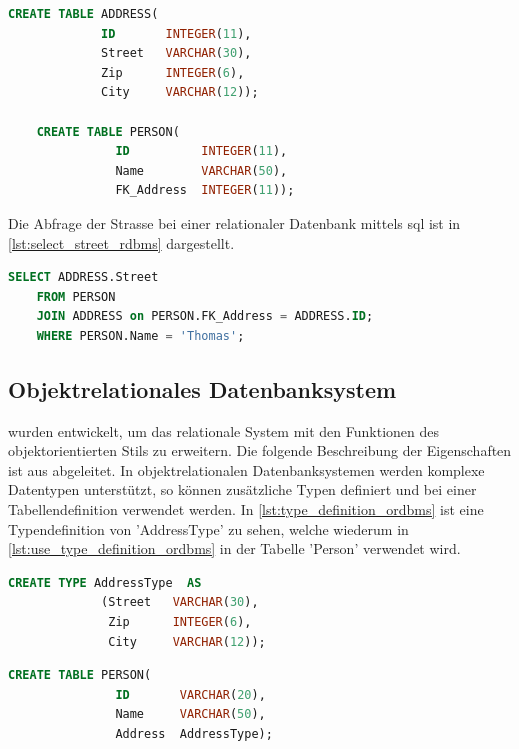\begin{lstlisting}[language=SQL, caption=Tabellendefinition in relationalem Datenbanksystem, label=lst:table_definition_rdbms]  
    CREATE TABLE ADDRESS(
             ID       INTEGER(11),
             Street   VARCHAR(30),
             Zip      INTEGER(6),
             City     VARCHAR(12));

    CREATE TABLE PERSON(
               ID          INTEGER(11),
               Name        VARCHAR(50),
               FK_Address  INTEGER(11));
\end{lstlisting}

Die Abfrage der Strasse bei einer relationaler Datenbank mittels \gls{sql} ist in \autoref{lst:select_street_rdbms} dargestellt.

\begin{lstlisting}[language=SQL, caption=Abfrage in relationalem Datenbanksystem, label=lst:select_street_rdbms]  
    SELECT ADDRESS.Street
    FROM PERSON 
    JOIN ADDRESS on PERSON.FK_Address = ADDRESS.ID;
    WHERE PERSON.Name = 'Thomas';
\end{lstlisting}

\subsection{Objektrelationales Datenbanksystem}\label{ordbms}
 wurden entwickelt, um das relationale System mit den Funktionen des objektorientierten Stils zu erweitern.
Die folgende Beschreibung der Eigenschaften ist aus \cite{limited2010introduction} abgeleitet. In objektrelationalen Datenbanksystemen werden 
komplexe Datentypen unterstützt, so können zusätzliche Typen definiert und bei einer Tabellendefinition verwendet werden.  
In \autoref{lst:type_definition_ordbms} ist eine Typendefinition von 'AddressType' zu sehen, welche wiederum in \autoref{lst:use_type_definition_ordbms} 
in der Tabelle 'Person' verwendet wird.

\begin{lstlisting}[language=SQL, caption=Typendefinition im objektrelationalen Datenbanksystem, label=lst:type_definition_ordbms]  
    CREATE TYPE AddressType  AS
             (Street   VARCHAR(30),
              Zip      INTEGER(6),
              City     VARCHAR(12));
\end{lstlisting}

\begin{lstlisting}[language=SQL, caption=Verwendung von Typendefinition im objektrelationalen Datenbanksystem, label=lst:use_type_definition_ordbms]  
    CREATE TABLE PERSON(
               ID       VARCHAR(20),
               Name     VARCHAR(50),
               Address  AddressType);
\end{lstlisting}

